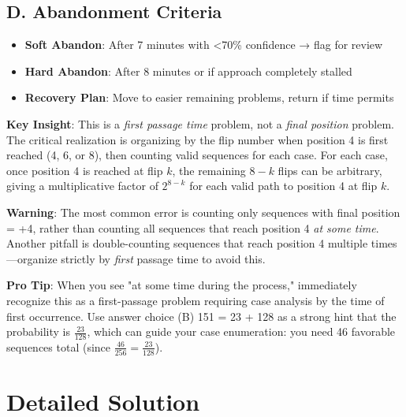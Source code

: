\documentclass[]{article}
\begin{document}
\begin{competitionbox}
\subsection*{D. Abandonment Criteria}
\begin{itemize}[leftmargin=*]
    \item \textbf{Soft Abandon}: After 7 minutes with <70\% confidence → flag for review
    \item \textbf{Hard Abandon}: After 8 minutes or if approach completely stalled
    \item \textbf{Recovery Plan}: Move to easier remaining problems, return if time permits
\end{itemize}
\end{competitionbox}

\begin{keyinsightbox}
\textbf{Key Insight}: This is a \textit{first passage time} problem, not a \textit{final position} problem. The critical realization is organizing by the flip number when position 4 is first reached (4, 6, or 8), then counting valid sequences for each case. For each case, once position 4 is reached at flip $k$, the remaining $8-k$ flips can be arbitrary, giving a multiplicative factor of $2^{8-k}$ for each valid path to position 4 at flip $k$.
\end{keyinsightbox}

\begin{warningbox}
\textbf{Warning}: The most common error is counting only sequences with final position = +4, rather than counting all sequences that reach position 4 \textit{at some time}. Another pitfall is double-counting sequences that reach position 4 multiple times—organize strictly by \textit{first} passage time to avoid this.
\end{warningbox}

\begin{tipbox}
\textbf{Pro Tip}: When you see "at some time during the process," immediately recognize this as a first-passage problem requiring case analysis by the time of first occurrence. Use answer choice (B) 151 = 23 + 128 as a strong hint that the probability is $\frac{23}{128}$, which can guide your case enumeration: you need 46 favorable sequences total (since $\frac{46}{256} = \frac{23}{128}$).
\end{tipbox}

\section*{Detailed Solution}
\end{document}
